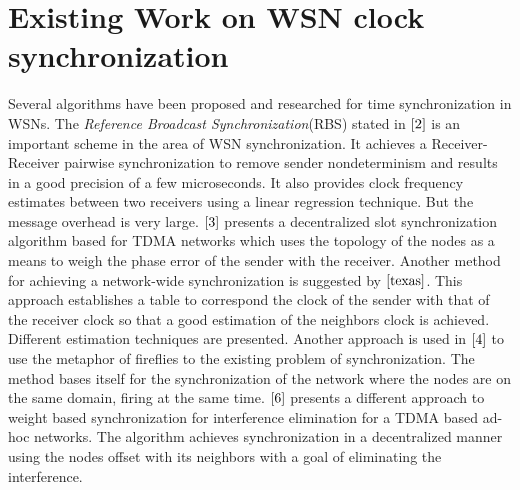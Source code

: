 \documentclass[a4paper,10pt]{report}
\begin{document}
\section{\textbf{Existing Work on WSN clock synchronization}}
\noindent Several algorithms have been proposed
and researched for time synchronization in WSNs. The
\textit{Reference Broadcast Synchronization}(RBS) stated in
$\cite{2}$ is an important scheme in the area of WSN
synchronization. It achieves a Receiver-Receiver pairwise
synchronization to remove sender nondeterminism and results in a
good precision of a few microseconds. It also provides clock
frequency estimates between two receivers using a linear regression
technique. But the message overhead is very large. $\cite{3}$
presents a decentralized slot synchronization algorithm based for
TDMA networks which uses the topology of the nodes as a means to
weigh the phase error of the sender with the receiver.
\newline
Another method for achieving a network-wide synchronization is
suggested by $\cite{texas}$. This approach establishes a table to
correspond the clock of the sender with that of the receiver clock so
that a good estimation of the neighbors clock is achieved. Different estimation
techniques are presented. Another
approach is used in $\cite{4}$ to use the metaphor of fireflies to
the existing problem of synchronization. The method bases itself for
the synchronization of the network where the nodes are on the same
domain, firing at the same time. $\cite{6}$
presents a different approach to weight based synchronization for
interference elimination for a TDMA based ad-hoc networks. The algorithm
achieves synchronization in a decentralized manner using the nodes offset with its
neighbors with a goal of eliminating the interference.
\end{document}
